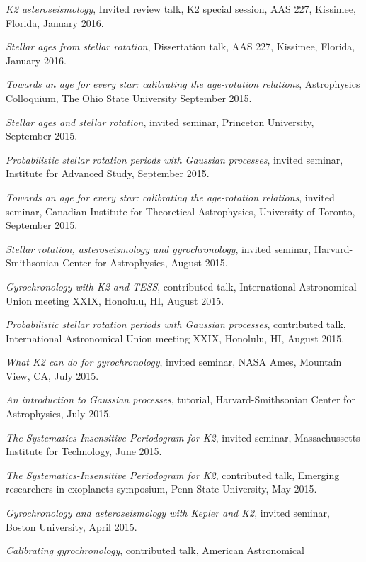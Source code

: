 \documentclass[12pt,letterpaper]{article}
\begin{document}
\begin{list}{}{\cvlist}
\item
{\it K2 asteroseismology}, Invited review talk, K2 special session, AAS 227,
Kissimee, Florida, January 2016.
\item
{\it Stellar ages from stellar rotation}, Dissertation talk, AAS 227,
Kissimee, Florida, January 2016.
\item
{\it Towards an age for every star: calibrating the age-rotation relations},
Astrophysics Colloquium, The Ohio State University September 2015.
\item
{\it Stellar ages and stellar rotation}, invited seminar, Princeton
University, September 2015.
\item
{\it Probabilistic stellar rotation periods with Gaussian processes},
invited seminar, Institute for Advanced Study, September 2015.
\item
{\it Towards an age for every star: calibrating the age-rotation relations},
invited seminar, Canadian Institute for Theoretical Astrophysics,
University of Toronto, September 2015.
\item
{\it Stellar rotation, asteroseismology and gyrochronology}, invited seminar,
Harvard-Smithsonian Center for Astrophysics, August 2015.
\item
{\it Gyrochronology with K2 and TESS}, contributed talk, International
Astronomical Union meeting XXIX, Honolulu, HI, August 2015.
\item
{\it Probabilistic stellar rotation periods with Gaussian processes},
contributed talk, International Astronomical Union meeting XXIX, Honolulu, HI,
August 2015.
\item
{\it What K2 can do for gyrochronology}, invited seminar, NASA Ames, Mountain
View, CA, July 2015.
\item
{\it An introduction to Gaussian processes}, tutorial, Harvard-Smithsonian
Center for Astrophysics, July 2015.
\item
{\it The Systematics-Insensitive Periodogram for K2}, invited seminar,
Massachussetts Institute for Technology, June 2015.
\item
{\it The Systematics-Insensitive Periodogram for K2}, contributed talk,
Emerging researchers in exoplanets symposium, Penn State University, May 2015.
\item
{\it Gyrochronology and asteroseismology with Kepler and K2}, invited
seminar, Boston University, April 2015.
\item
{\it Calibrating gyrochronology}, contributed talk, American Astronomical

\end{list}
\end{document}

